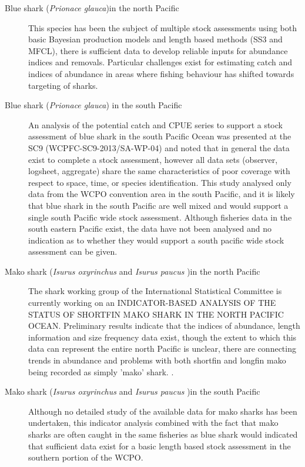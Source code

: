 \documentclass[12pt]{SCreport}
\begin{document}
\begin{description}
  \item[Blue shark (\emph{Prionace glauca})in the north Pacific] This species has been the subject of multiple stock assessments using both basic Bayesian production models and length based methods (SS3 and MFCL), there is sufficient data to develop reliable inputs for abundance indices and removals. Particular challenges exist for estimating catch and indices of abundance in areas where fishing behaviour has shifted towards targeting of sharks. 
  
\item[Blue shark (\emph{Prionace glauca}) in the south Pacific]
An analysis of the potential catch and CPUE series to support a stock assessment of blue shark in the south Pacific Ocean was presented at the SC9 (WCPFC-SC9-2013/SA-WP-04) and noted that in general the data exist to complete a stock assessment, however all data sets (observer, logsheet, aggregate) share the same characteristics of poor coverage with respect to space, time, or species identification. This study analysed only data from the WCPO convention area in the south Pacific, and it is likely that blue shark in the south Pacific are well mixed and would support a single south Pacific wide stock assessment. Although fisheries data in the south eastern Pacific exist, the data have not been analysed and no indication as to whether they would support a south pacific wide stock assessment can be given.

\item[Mako shark (\emph{Isurus oxyrinchus} and \emph{Isurus paucus} )in the north Pacific] The shark working group of the International Statistical Committee is currently working on an INDICATOR-BASED ANALYSIS OF THE STATUS OF SHORTFIN MAKO SHARK IN THE NORTH PACIFIC OCEAN. Preliminary results indicate that the indices of abundance, length information and size frequency data exist, though the extent to which this data can represent the entire north Pacific is unclear, there are connecting trends in abundance and problems with both shortfin and longfin mako being recorded as simply 'mako' shark. .

\item[Mako shark (\emph{Isurus oxyrinchus} and \emph{Isurus paucus} )in the south Pacific] Although no detailed study of the available data for mako sharks has been undertaken, this indicator analysis combined with the fact that mako sharks are often caught in the same fisheries as blue shark would indicated that sufficient data exist for a basic length based stock assessment in the southern portion of the WCPO.


\end{description}
\end{document}
